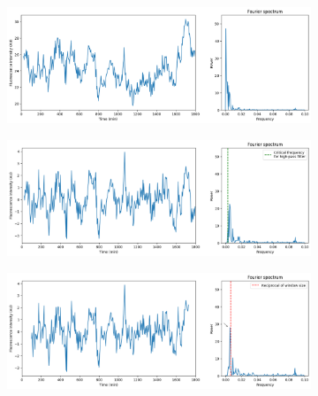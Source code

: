 \begin{figure}
  \centering
  \begin{subfigure}[htpb]{0.8\textwidth}
   \centering
   \includegraphics[width=\textwidth]{fft_raw}
   \caption{
   }
   \label{fig:analysis-filter-raw}
  \end{subfigure}

  \begin{subfigure}[htpb]{0.8\textwidth}
   \centering
   \includegraphics[width=\textwidth]{fft_butterworth}
   \caption{
   }
   \label{fig:analysis-filter-butterworth}
  \end{subfigure}

  \begin{subfigure}[htpb]{0.8\textwidth}
   \centering
   \includegraphics[width=\textwidth]{fft_slidingwindow_edit}
   \caption{
   }
   \label{fig:analysis-filter-movavg}
  \end{subfigure}


\end{figure}
